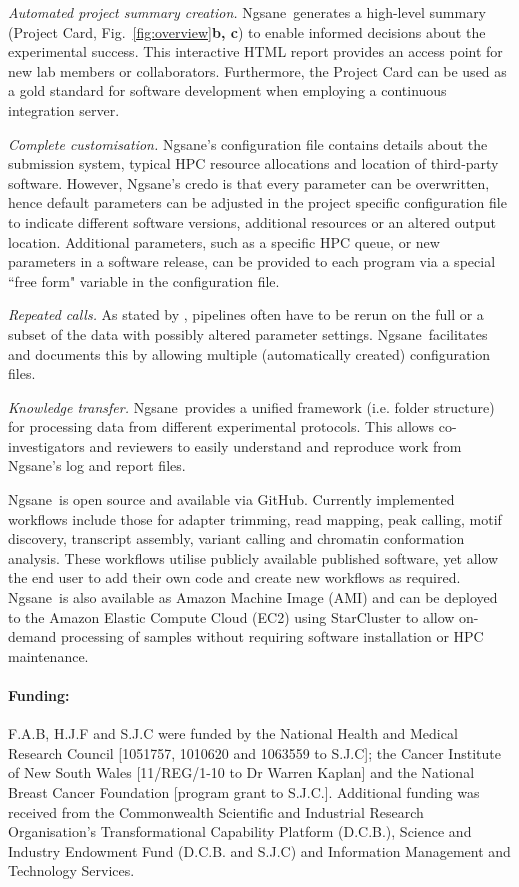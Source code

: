 \documentclass{bioinfo}
\newcommand{\prog}{{\sc Ngsane}}
\begin{document}
{\it Automated project summary creation.}
\prog\ generates a high-level summary (Project Card, Fig.~\ref{fig:overview}{\bf b, c}) to enable informed decisions about the experimental success. 
This interactive HTML report provides an access point for new lab members or collaborators. 
Furthermore, the Project Card can be used as a gold standard for software development when employing a continuous integration server.

{\it Complete customisation.}
\prog's configuration file contains details about the submission system, typical HPC resource allocations and location of third-party software.
However, \prog 's credo is that every parameter can be overwritten, hence default parameters can be adjusted in the project specific configuration file to indicate different software versions, additional resources or an altered output location. 
Additional parameters, such as a specific HPC queue, or new parameters in a software release, can be provided to each program via a special ``free form" variable in the configuration file.  

{\it Repeated calls.}
As stated by \citet{McCoy2013}, pipelines often have to be rerun on the full or a subset of the data with possibly altered parameter settings. 
\prog\ facilitates and documents this by allowing multiple (automatically created) configuration files. 

{\it Knowledge transfer.}
\prog\ provides a unified framework (i.e. folder structure) for processing data from different experimental protocols. 
This allows co-investigators and reviewers to easily understand and reproduce work from \prog 's log and report files. 

\prog\ is open source and available via GitHub.
Currently implemented workflows include those for adapter trimming, read mapping, peak calling, motif discovery, transcript assembly, variant calling and chromatin conformation analysis.
These workflows utilise publicly available published software, yet allow the end user to add their own code and create new workflows as required.
\prog\ is also available as Amazon Machine Image (AMI) and can be deployed to the Amazon Elastic Compute Cloud (EC2) using  {\sc StarCluster} to allow on-demand processing of samples without requiring software installation or HPC maintenance.   

\paragraph{Funding:} 
F.A.B, H.J.F and S.J.C were funded by the National Health and Medical Research Council [1051757, 1010620 and 1063559 to S.J.C]; the Cancer Institute of New South Wales [11/REG/1-10 to Dr Warren Kaplan] and the National Breast Cancer Foundation [program grant to S.J.C.]. Additional funding was received from the Commonwealth Scientific and Industrial Research Organisation's Transformational Capability Platform (D.C.B.), Science and Industry Endowment Fund (D.C.B. and S.J.C) and Information Management and Technology Services.
\end{document}
